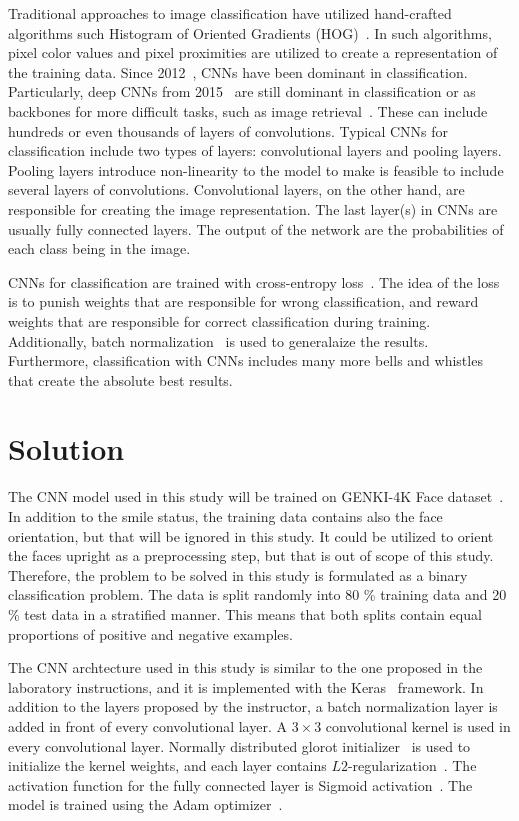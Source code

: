 \documentclass{article}
\begin{document}
Traditional approaches to image classification have utilized
hand-crafted algorithms such Histogram of Oriented Gradients
(HOG)~\cite{hogs}. In such algorithms, pixel color values and pixel
proximities are utilized to create a representation of the training
data. Since 2012~\cite{krizhevsky_2017}, CNNs have been dominant in
classification. Particularly, deep CNNs from 2015~\cite{he_2015} are
still dominant in classification or as backbones for more difficult
tasks, such as image retrieval~\cite{teichman_2018}. These can include
hundreds or even thousands of layers of convolutions. Typical CNNs for
classification include two types of layers: convolutional layers and
pooling layers. Pooling layers introduce non-linearity to the model to
make is feasible to include several layers of convolutions.
Convolutional layers, on the other hand, are responsible for creating
the image representation. The last layer(s) in CNNs are usually fully
connected layers. The output of the network are the probabilities of
each class being in the image.~\cite{cs231n}

CNNs for classification are trained with cross-entropy loss~\cite[Ch.
  6]{goodfellow_2016}. The idea of the loss is to punish weights that
are responsible for wrong classification, and reward weights that are
responsible for correct classification during training. Additionally,
batch normalization~\cite{ioffe_2015} is used to generalaize the
results. Furthermore, classification with CNNs includes many more
bells and whistles that create the absolute best results.

\section{Solution}\label{sec:solution}
The CNN model used in this study will be trained on GENKI-4K Face
dataset~\cite{GENKI-4K}. In addition to the smile status, the training
data contains also the face orientation, but that will be ignored in
this study. It could be utilized to orient the faces upright as a
preprocessing step, but that is out of scope of this study. Therefore,
the problem to be solved in this study is formulated as a binary
classification problem. The data is split randomly into 80 \% training
data and 20 \% test data in a stratified manner. This means that both
splits contain equal proportions of positive and negative examples.

The CNN archtecture used in this study is similar to the one proposed
in the laboratory instructions, and it is implemented with the
Keras~\cite{keras} framework. In addition to the layers proposed by
the instructor, a batch normalization layer is added in front of every
convolutional layer. A $3 \times 3$ convolutional kernel is used in
every convolutional layer. Normally distributed glorot
initializer~\cite{glorot10a} is used to initialize the kernel weights,
and each layer contains $L2$-regularization~\cite[Ch.
  7]{goodfellow_2016}. The activation function for the fully connected
layer is Sigmoid activation~\cite[Ch. 6]{goodfellow_2016}. The model
is trained using the Adam optimizer~\cite{adam_optimizer}.
\end{document}
